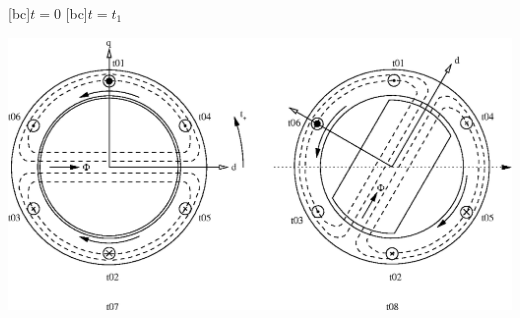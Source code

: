 \begin{psfrags}%
\psfragscanon

[bc]{$t=0$}
[bc]{$t=t_1$}

\includegraphics[width=1.00\textwidth]{figs/f_mmf_rotation.eps}
\end{psfrags}%